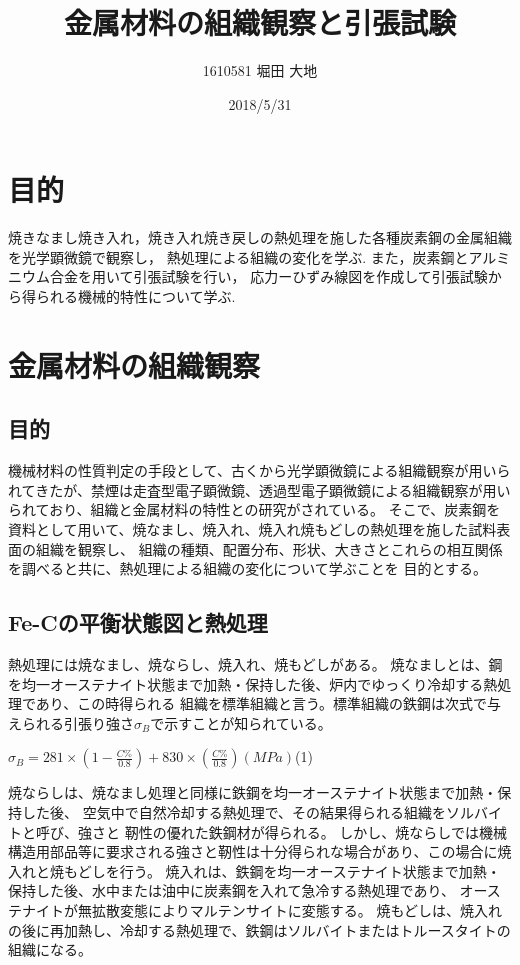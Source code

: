 \documentclass[10pt,a4j]{jsarticle}
\title{\vspace{-2.5cm}金属材料の組織観察と引張試験}
\author{1610581 堀田 大地}
\date{2018/5/31}
\begin{document}
\maketitle{}
\section{目的}
焼きなまし焼き入れ，焼き入れ焼き戻しの熱処理を施した各種炭素鋼の金属組織を光学顕微鏡で観察し，
熱処理による組織の変化を学ぶ.
また，炭素鋼とアルミニウム合金を用いて引張試験を行い，
応力ーひずみ線図を作成して引張試験から得られる機械的特性について学ぶ.
\section{金属材料の組織観察}
  \subsection{目的}
  機械材料の性質判定の手段として、古くから光学顕微鏡による組織観察が用いられてきたが、禁煙は走査型電子顕微鏡、透過型電子顕微鏡による組織観察が用いられており、組織と金属材料の特性との研究がされている。
  そこで、炭素鋼を資料として用いて、焼なまし、焼入れ、焼入れ焼もどしの熱処理を施した試料表面の組織を観察し、
  組織の種類、配置分布、形状、大きさとこれらの相互関係を調べると共に、熱処理による組織の変化について学ぶことを
  目的とする。
  \subsection{Fe-Cの平衡状態図と熱処理}
  熱処理には焼なまし、焼ならし、焼入れ、焼もどしがある。
  焼なましとは、鋼を均一オーステナイト状態まで加熱・保持した後、炉内でゆっくり冷却する熱処理であり、この時得られる
  組織を標準組織と言う。標準組織の鉄鋼は次式で与えられる引張り強さ$σ_{B}$で示すことが知られている。
    \begin{center}
	  $σ_{B} =281 \times (1-\frac{C\%}{0.8})+830 \times (\frac{C\%}{0.8})  (MPa)
      $\quad(1)
  \end{center}
  焼ならしは、焼なまし処理と同様に鉄鋼を均一オーステナイト状態まで加熱・保持した後、
  空気中で自然冷却する熱処理で、その結果得られる組織をソルバイトと呼び、強さと
  靭性の優れた鉄鋼材が得られる。
  しかし、焼ならしでは機械構造用部品等に要求される強さと靭性は十分得られな場合があり、この場合に焼入れと焼もどしを行う。
  焼入れは、鉄鋼を均一オーステナイト状態まで加熱・保持した後、水中または油中に炭素鋼を入れて急冷する熱処理であり、
  オーステナイトが無拡散変態によりマルテンサイトに変態する。
  焼もどしは、焼入れの後に再加熱し、冷却する熱処理で、鉄鋼はソルバイトまたはトルースタイトの組織になる。
  
\end{document}
